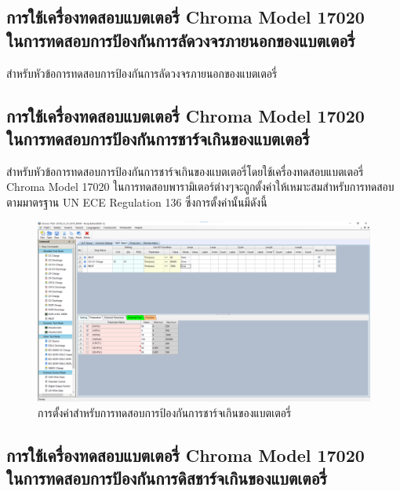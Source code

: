 \subsection{การใช้เครื่องทดสอบแบตเตอรี่ Chroma Model 17020 \\ ในการทดสอบการป้องกันการลัดวงจรภายนอกของแบตเตอรี่}
สำหรับหัวข้อการทดสอบการป้องกันการลัดวงจรภายนอกของแบตเตอรี่
\subsection{การใช้เครื่องทดสอบแบตเตอรี่ Chroma Model 17020 \\ ในการทดสอบการป้องกันการชาร์จเกินของแบตเตอรี่}
สำหรับหัวข้อการทดสอบการป้องกันการชาร์จเกินของแบตเตอรี่โดยใช้เครื่องทดสอบแบตเตอรี่ Chroma Model 17020 ในการทดสอบพารามิเตอร์ต่างๆจะถูกตั้งค่าให้เหมาะสมสำหรับการทดสอบตามมาตรฐาน UN ECE Regulation 136 ซึ่งการตั้งค่านั้นมีดังนี้
\begin{center}
	\begin{figure}[!h]
		\includegraphics[width=0.8\linewidth]{Chapters/img/R136_DEMO/UUT_TEST_OVCP.png}
		\centering
		\captionsetup{justification=centering,margin=2cm}
		\caption{การตั้งค่าสำหรับการทดสอบการป้องกันการชาร์จเกินของแบตเตอรี่}
	\end{figure}
\end{center}
\subsection{การใช้เครื่องทดสอบแบตเตอรี่ Chroma Model 17020 \\ ในการทดสอบการป้องกันการดิสชาร์จเกินของแบตเตอรี่}
















